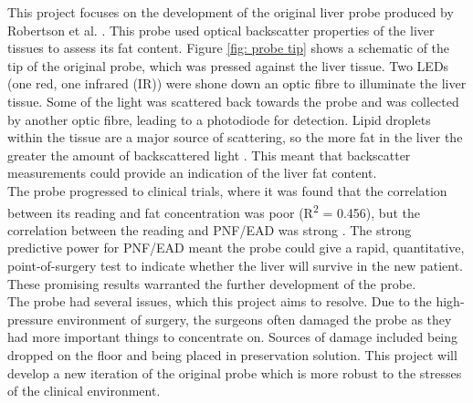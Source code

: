This project focuses on the development of the original liver probe produced by Robertson et al. \cite{Robertson}. This probe used optical backscatter properties of the liver tissues to assess its fat content. Figure \ref{fig: probe tip} shows a schematic of the tip of the original probe, which was pressed against the liver tissue. Two LEDs (one red, one infrared (IR)) were shone down an optic fibre to illuminate the liver tissue. Some of the light was scattered back towards the probe and was collected by another optic fibre, leading to a photodiode for detection. Lipid droplets within the tissue are a major source of scattering, so the more fat in the liver the greater the amount of backscattered light \cite{McLaughlin}. This meant that backscatter measurements could provide an indication of the liver fat content.\\

The probe progressed to clinical trials, where it was found that the correlation between its reading and fat concentration was poor (R\textsuperscript{2} = 0.456), but the correlation between the reading and PNF/EAD was strong \cite{Robertson}. The strong predictive power for PNF/EAD meant the probe could give a rapid, quantitative, point-of-surgery test to indicate whether the liver will survive in the new patient. These promising results warranted the further development of the probe.\\

The probe had several issues, which this project aims to resolve. Due to the high-pressure environment of surgery, the surgeons often damaged the probe as they had more important things to concentrate on. Sources of damage included being dropped on the floor and being placed in preservation solution. This project will develop a new iteration of the original probe which is more robust to the stresses of the clinical environment.\\




